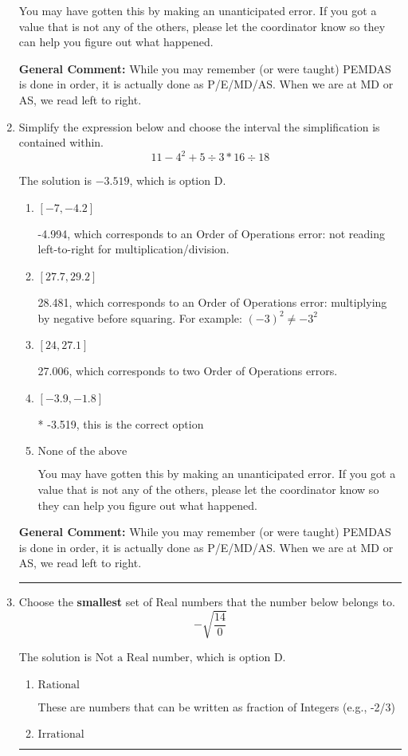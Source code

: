 \documentclass{extbook}[14pt]
\newcommand{\litem}[1]{\item #1

\rule{\textwidth}{0.4pt}}
\begin{document}
\begin{enumerate}
{\begin{enumerate}[label=\Alph*.]
 You may have gotten this by making an unanticipated error. If you got a value that is not any of the others, please let the coordinator know so they can help you figure out what happened.
\end{enumerate}

\textbf{General Comment:} While you may remember (or were taught) PEMDAS is done in order, it is actually done as P/E/MD/AS. When we are at MD or AS, we read left to right.
}
\litem{
Simplify the expression below and choose the interval the simplification is contained within.
\[ 11 - 4^2 + 5 \div 3 * 16 \div 18 \]

The solution is \( -3.519 \), which is option D.\begin{enumerate}[label=\Alph*.]
\item \( [-7, -4.2] \)

 -4.994, which corresponds to an Order of Operations error: not reading left-to-right for multiplication/division.
\item \( [27.7, 29.2] \)

 28.481, which corresponds to an Order of Operations error: multiplying by negative before squaring. For example: $(-3)^2 \neq -3^2$
\item \( [24, 27.1] \)

 27.006, which corresponds to two Order of Operations errors.
\item \( [-3.9, -1.8] \)

* -3.519, this is the correct option
\item \( \text{None of the above} \)

 You may have gotten this by making an unanticipated error. If you got a value that is not any of the others, please let the coordinator know so they can help you figure out what happened.
\end{enumerate}

\textbf{General Comment:} While you may remember (or were taught) PEMDAS is done in order, it is actually done as P/E/MD/AS. When we are at MD or AS, we read left to right.
}
\litem{
Choose the \textbf{smallest} set of Real numbers that the number below belongs to.
\[ -\sqrt{\frac{14}{0}} \]

The solution is \( \text{Not a Real number} \), which is option D.\begin{enumerate}[label=\Alph*.]
\item \( \text{Rational} \)

These are numbers that can be written as fraction of Integers (e.g., -2/3)
\item \( \text{Irrational} \)


\end{enumerate}}
\end{enumerate}
\end{document}
